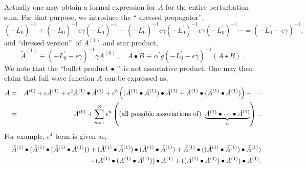 \documentclass[a4paper,aps,preprint,nofootinbib,eqsecnum]{revtex4}
\begin{document}
Actually one may obtain a formal expression for $A$ for the entire
perturbation sum. For that purpose, we introduce the \textquotedblleft
dressed propagator\textquotedblright ,
\begin{equation}
(-L_{0}^{\prime })^{-1}+(-L_{0}^{\prime })^{-1}\epsilon \gamma
(-L_{0}^{\prime })^{-1}+(-L_{0}^{\prime })^{-1}\epsilon \gamma
(-L_{0}^{\prime })^{-1}\epsilon \gamma (-L_{0}^{\prime })^{-1}\cdots
=(-L_{0}^{\prime }-\epsilon \gamma )^{-1},
\end{equation}%
and \textquotedblleft dressed version\textquotedblright\ of $A^{\left(
1\right) }$ and star product,
\begin{equation}
\tilde{A}^{\left( 1\right) }\equiv (-L_{0}^{\prime }-\epsilon \gamma
)^{-1}\gamma A^{\left( 0\right) }\,,\quad A\bullet B\equiv {\alpha ^{\prime }%
}g(-L_{0}^{\prime }-\epsilon \gamma )^{-1}(A\star B)\,\,.
\end{equation}%
We note that the \textquotedblleft bullet product $\bullet $%
\textquotedblright\ is not associative product. One may then claim that full
wave function $A$ can be expressed as,
\begin{eqnarray}
A &=&A^{\left( 0\right) }+\epsilon \tilde{A}^{\left( 1\right) }+\epsilon ^{2}%
\tilde{A}^{\left( 1\right) }\bullet \tilde{A}^{\left( 1\right) }+\epsilon
^{3}\left( (\tilde{A}^{\left( 1\right) }\bullet \tilde{A}^{\left( 1\right)
})\bullet \tilde{A}^{\left( 1\right) }+\tilde{A}^{\left( 1\right) }\bullet (%
\tilde{A}^{\left( 1\right) }\bullet \tilde{A}^{\left( 1\right) })\right)
+\cdots  \notag \\
&=&A^{\left( 0\right) }+\sum_{n=1}^{\infty }\epsilon ^{n}\left(
\mbox{(all possible associations
of) }\underbrace{\tilde{A}^{\left( 1\right) }\bullet \cdots \bullet \tilde{A}%
^{\left( 1\right) }}_{n}\right) \,\,.  \label{full_sols}
\end{eqnarray}%
For example, $\epsilon ^{4}$ term is given as,
\begin{eqnarray}
&&\tilde{A}^{\left( 1\right) }\bullet (\tilde{A}^{\left( 1\right) }\bullet (%
\tilde{A}^{\left( 1\right) }\bullet \tilde{A}^{\left( 1\right) }))+(\tilde{A}%
^{\left( 1\right) }\bullet \tilde{A}^{\left( 1\right) })\bullet (\tilde{A}%
^{\left( 1\right) }\bullet \tilde{A}^{\left( 1\right) })+\tilde{A}^{\left(
1\right) }\bullet ((\tilde{A}^{\left( 1\right) }\bullet \tilde{A}^{\left(
1\right) })\bullet \tilde{A}^{\left( 1\right) })  \notag \\
&&+(\tilde{A}^{\left( 1\right) }\bullet (\tilde{A}^{\left( 1\right) }\bullet
\tilde{A}^{\left( 1\right) }))\bullet \tilde{A}^{\left( 1\right) }+((\tilde{A%
}^{\left( 1\right) }\bullet \tilde{A}^{\left( 1\right) })\bullet \tilde{A}%
^{\left( 1\right) })\bullet \tilde{A}^{\left( 1\right) }.  \notag
\end{eqnarray}%
\end{document}
